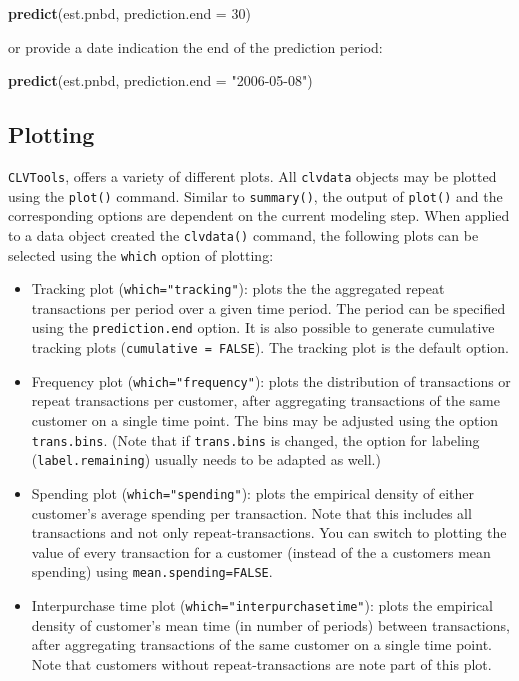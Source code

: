 \documentclass[
]{article}
\newenvironment{Shaded}{\begin{snugshade}}{\end{snugshade}}
\newcommand{\AttributeTok}[1]{\textcolor[rgb]{0.13,0.29,0.53}{#1}}
\newcommand{\DecValTok}[1]{\textcolor[rgb]{0.00,0.00,0.81}{#1}}
\newcommand{\FunctionTok}[1]{\textcolor[rgb]{0.13,0.29,0.53}{\textbf{#1}}}
\newcommand{\NormalTok}[1]{#1}
\newcommand{\StringTok}[1]{\textcolor[rgb]{0.31,0.60,0.02}{#1}}
\providecommand{\tightlist}{%
  \setlength{\itemsep}{0pt}\setlength{\parskip}{0pt}}
\begin{document}
\begin{Shaded}
\begin{Highlighting}[]
\FunctionTok{predict}\NormalTok{(est.pnbd, }\AttributeTok{prediction.end =} \DecValTok{30}\NormalTok{)}
\end{Highlighting}
\end{Shaded}

or provide a date indication the end of the prediction period:

\begin{Shaded}
\begin{Highlighting}[]
\FunctionTok{predict}\NormalTok{(est.pnbd, }\AttributeTok{prediction.end =} \StringTok{"2006{-}05{-}08"}\NormalTok{)}
\end{Highlighting}
\end{Shaded}

\subsection{Plotting}\label{plotting}

\texttt{CLVTools}, offers a variety of different plots. All
\texttt{clvdata} objects may be plotted using the \texttt{plot()}
command. Similar to \texttt{summary()}, the output of \texttt{plot()}
and the corresponding options are dependent on the current modeling
step. When applied to a data object created the \texttt{clvdata()}
command, the following plots can be selected using the \texttt{which}
option of plotting:

\begin{itemize}
\tightlist
\item
  Tracking plot (\texttt{which="tracking"}): plots the the aggregated
  repeat transactions per period over a given time period. The period
  can be specified using the \texttt{prediction.end} option. It is also
  possible to generate cumulative tracking plots
  (\texttt{cumulative\ =\ FALSE}). The tracking plot is the default
  option.
\item
  Frequency plot (\texttt{which="frequency"}): plots the distribution of
  transactions or repeat transactions per customer, after aggregating
  transactions of the same customer on a single time point. The bins may
  be adjusted using the option \texttt{trans.bins}. (Note that if
  \texttt{trans.bins} is changed, the option for labeling
  (\texttt{label.remaining}) usually needs to be adapted as well.)
\item
  Spending plot (\texttt{which="spending"}): plots the empirical density
  of either customer's average spending per transaction. Note that this
  includes all transactions and not only repeat-transactions. You can
  switch to plotting the value of every transaction for a customer
  (instead of the a customers mean spending) using
  \texttt{mean.spending=FALSE}.
\item
  Interpurchase time plot (\texttt{which="interpurchasetime"}): plots
  the empirical density of customer's mean time (in number of periods)
  between transactions, after aggregating transactions of the same
  customer on a single time point. Note that customers without
  repeat-transactions are note part of this plot.
\end{itemize}
\end{document}
